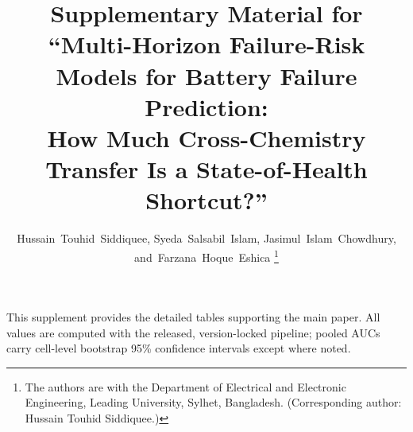 \documentclass[journal]{IEEEtran}
\begin{document}
\title{Supplementary Material for\\ ``Multi-Horizon Failure-Risk Models for Battery Failure Prediction:\\ How Much Cross-Chemistry Transfer Is a State-of-Health Shortcut?''}

\author{Hussain~Touhid~Siddiquee,
        Syeda~Salsabil~Islam,
        Jasimul~Islam~Chowdhury,
        and~Farzana~Hoque~Eshica%
\thanks{The authors are with the Department of Electrical and Electronic Engineering, Leading University, Sylhet, Bangladesh. (Corresponding author: Hussain Touhid Siddiquee.)}}

\maketitle

This supplement provides the detailed tables supporting the main paper. All values are computed with the released, version-locked pipeline; pooled AUCs carry cell-level bootstrap 95\% confidence intervals except where noted.
\end{document}
